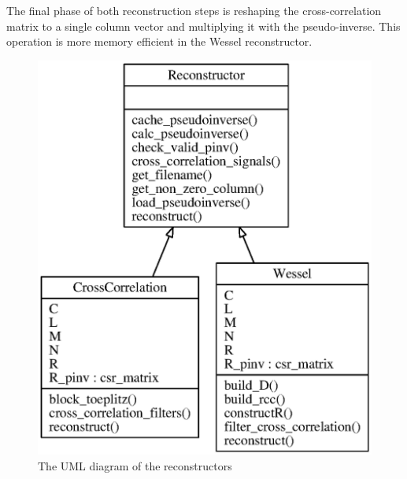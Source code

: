 \documentclass[a4paper, openany, oneside]{memoir}
\begin{document}
The final phase of both reconstruction steps is reshaping the cross-correlation matrix to a single column vector and multiplying it with the pseudo-inverse. This operation is more memory efficient in the Wessel reconstructor.


\begin{figure}
    \centering
    \includegraphics{./figures/classes_reconstruction.eps}
    \caption{The UML diagram of the reconstructors}
    \label{fig:umlreconstructor}
\end{figure}
\end{document}
